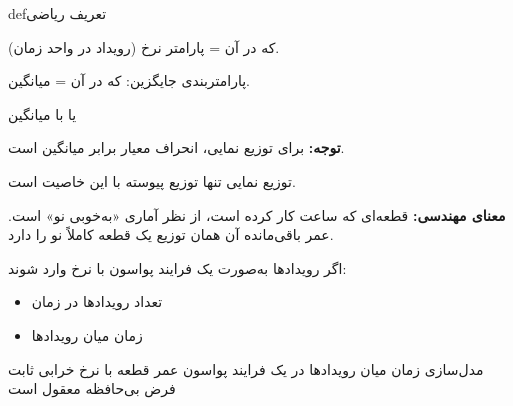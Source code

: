 \begin{PSbox}[unbreakable]{def}{تعریف ریاضی}

 که در آن \lr{$\lambda$} = پارامتر نرخ (رویداد در واحد زمان).

پارامتربندی جایگزین:  که در آن  = میانگین.

\end{PSbox}



یا با میانگین 







\textbf{توجه:} برای توزیع نمایی، انحراف معیار برابر میانگین است.



توزیع نمایی تنها توزیع پیوسته با این خاصیت است.

\textbf{معنای مهندسی:} قطعه‌ای که  ساعت کار کرده است، از نظر آماری «به‌خوبی نو» است. عمر باقی‌مانده آن همان توزیع یک قطعه کاملاً نو را دارد.


اگر رویدادها به‌صورت یک فرایند پواسون با نرخ \lr{$\lambda$} وارد شوند:

\begin{itemize}
\tightlist
\item
  تعداد رویدادها در زمان 
\item
  زمان میان رویدادها 
\end{itemize}


\lr{\mbox{\PSyes{}}} مدل‌سازی زمان میان رویدادها در یک فرایند پواسون\PSbr{}\lr{\mbox{\PSyes{}}} عمر قطعه با نرخ خرابی ثابت\PSbr{}\lr{\mbox{\PSyes{}}} فرض بی‌حافظه معقول است

